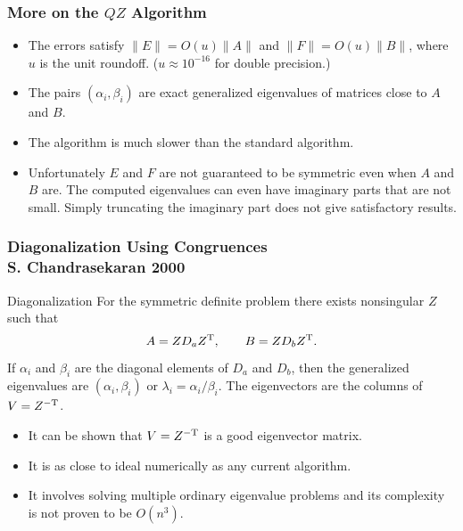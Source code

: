 \documentclass[landscape]{beamer}
\newcommand{\T}{{\rm T}}
\begin{document}
\begin{frame}
  \frametitle{More on the $QZ$ Algorithm}

  \begin{itemize}
  \item The errors satisfy $\|E\| = O(u)\|A\|$ and
    $\|F\| = O(u)\|B\|$, where $u$ is the unit roundoff.
    ($u\approx 10^{-16}$ for double precision.)
  \item The pairs $(\alpha_{i},\beta_{i})$ are exact generalized
    eigenvalues of matrices close to $A$ and $B$.
  \item The algorithm is much slower than the standard algorithm.
  \item Unfortunately $E$ and $F$ are not guaranteed to be symmetric
    even when $A$ and $B$ are.  The computed eigenvalues can even have
    imaginary parts that are not small.  Simply truncating the imaginary
    part does not give satisfactory results.
  \end{itemize}
\end{frame}

\begin{frame}
  \frametitle{Diagonalization Using Congruences \\
  S. Chandrasekaran 2000}

\begin{block}{Diagonalization}
  For the symmetric definite problem there exists nonsingular $Z$ such that
  \begin{equation*}
    A = Z D_a Z^\T, \qquad B = Z D_b Z^\T.
  \end{equation*}
  If $\alpha_i$ and $\beta_i$ are the diagonal elements of $D_a$ and
  $D_b$, then the generalized eigenvalues are $(\alpha_i, \beta_i)$ or
  $\lambda_i = \alpha_i/ \beta_i$.  The eigenvectors are the columns
  of $V= Z^{-\T}$.
\end{block}

\begin{itemize}
\item It can be shown that $V=Z^{-\T}$ is a good eigenvector matrix.
\item It is as close to ideal numerically as any current algorithm.
\item It involves solving multiple ordinary eigenvalue problems and its
  complexity is not proven to be $O(n^3)$.
\end{itemize}
\end{frame}
\end{document}
